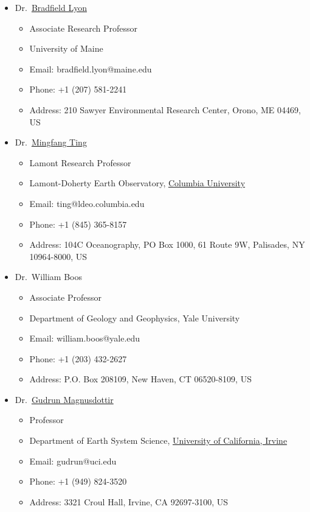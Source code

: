 \documentclass[11pt]{article}
\newcommand{\uci}{\href{http://www.uci.edu}{University of California, Irvine}}
\newcommand{\cu}{\href{http://www.columbia.edu}{Columbia University}}
\newcommand{\mingfang}{\href{http://www.ldeo.columbia.edu/user/ting}{Mingfang Ting}}
\newcommand{\brad}{\href{http://climatechange.umaine.edu/people/profile/bradfield_lyon}
{Bradfield Lyon}}
\newcommand{\gudrun}{\href{http://sites.uci.edu/magnusdottir}{Gudrun Magnusdottir}}
\begin{document}
\begin{CJK*}{UTF8}{gkai}
\begin{itemize}[leftmargin=4ex]
	\item Dr.~\brad{}
	\begin{itemize}
		\item Associate Research Professor
		\item University of Maine
    		\item Email: bradfield.lyon@maine.edu
		\item Phone: +1 (207) 581-2241
    	 	\item Address: 210 Sawyer Environmental Research Center, Orono, ME 04469, US 
	 	\end{itemize}
	
	\item Dr.~\mingfang{}
	\begin{itemize}
		\item Lamont Research Professor
		\item Lamont-Doherty Earth Observatory, \cu{}
    		\item Email: ting@ldeo.columbia.edu
		\item Phone: +1 (845) 365-8157 
    	 	\item Address: 104C Oceanography, PO Box 1000, 61 Route 9W, Palisades, NY 10964-8000, US 
	 	\end{itemize}
	
	\item Dr.~William Boos
	\begin{itemize}
		\item Associate Professor
		\item Department of Geology and Geophysics, Yale University
    		\item Email: william.boos@yale.edu
		\item Phone: +1 (203) 432-2627
    	 	\item Address: P.O. Box 208109, New Haven, CT 06520-8109, US 
	 	\end{itemize}
		
	\item Dr.~\gudrun{}
	\begin{itemize}
		\item Professor
		\item Department of Earth System Science, \uci{}
    		\item Email: gudrun@uci.edu
		\item Phone: +1 (949) 824-3520
    	 	\item Address: 3321 Croul Hall, Irvine, CA 92697-3100, US 
	 	\end{itemize}
	 
	 \end{itemize}
 
\clearpage\end{CJK*}
\end{document}
